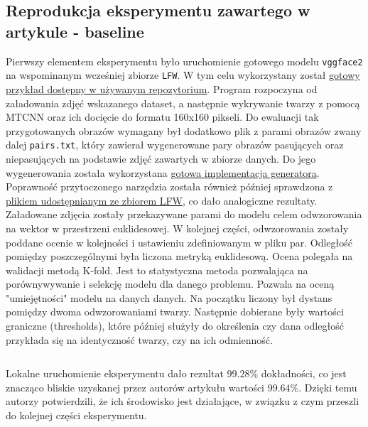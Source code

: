 \documentclass[11pt]{article}
\begin{document}
    \subsection{Reprodukcja eksperymentu zawartego w artykule - baseline}
    Pierwszy elementem eksperymentu było uruchomienie gotowego modelu \texttt{vggface2} na wspominanym wcześniej zbiorze \texttt{LFW}.
    W tym celu wykorzystany został \href{https://github.com/timesler/facenet-pytorch/blob/master/examples/lfw_evaluate.ipynb}{gotowy przykład dostępny w używanym repozytorium}.
    Program rozpoczyna od załadowania zdjęć wskazanego dataset, a następnie wykrywanie twarzy z pomocą MTCNN oraz ich docięcie do formatu 160x160 pikseli.
    Do ewaluacji tak przygotowanych obrazów wymagany był dodatkowo plik z parami obrazów zwany dalej \texttt{pairs.txt}, który zawierał wygenerowane pary obrazów pasujących oraz niepasujących na podstawie zdjęć zawartych
    w zbiorze danych. Do jego wygenerowania została wykorzystana \href{https://github.com/VictorZhang2014/facenet/blob/master/mydata/generate_pairs.py}{gotowa implementacja generatora}.
    Poprawność przytoczonego narzędzia została również później sprawdzona z \href{vis-www.cs.umass.edu/lfw/pairs.txt}{plikiem udostępnianym ze zbiorem LFW}, co dało analogiczne rezultaty.
    Załadowane zdjęcia zostały przekazywane parami do modelu celem odwzorowania na wektor w przestrzeni euklidesowej.
    W kolejnej części, odwzorowania zostały poddane ocenie w kolejności i ustawieniu zdefiniowanym w pliku par. Odległość pomiędzy poszczególnymi była liczona metryką euklidesową.
    Ocena polegała na walidacji metodą K-fold. Jest to statystyczna metoda pozwalająca na porównywywanie i selekcję modelu dla danego problemu. Pozwala na oceną "umiejętności" modelu na danych danych.
    Na początku liczony był dystans pomiędzy dwoma odwzorowaniami twarzy. Następnie dobierane były wartości graniczne (thresholds), które później służyły do określenia czy dana odległość przykłada się na identyczność twarzy,
    czy na ich odmienność.
    \begin{lstlisting}[language=Python, caption={Implementacja w języku Python},captionpos=b]
    \end{lstlisting}

    Lokalne uruchomienie eksperymentu dało rezultat $99.28\%$ dokładności, co jest znacząco bliskie uzyskanej przez autorów artykułu wartości $99.64$\%.
    Dzięki temu autorzy potwierdzili, że ich środowisko jest działające, w związku z czym przeszli do kolejnej części eksperymentu.
\end{document}
